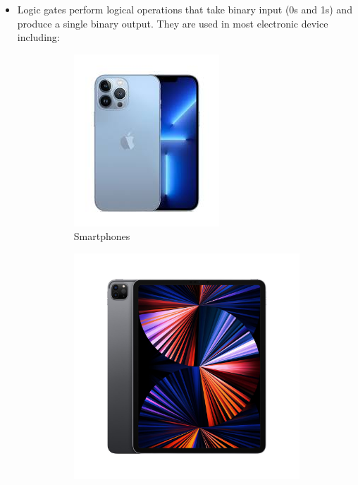 \documentclass{article}
\begin{document}
\begin{itemize}
		\item Logic gates perform logical operations that take binary input (0s and 1s) and produce  a single binary output. They are used in most electronic device including: \\
			\begin{figure}[h!]
				\centering
				\begin{subfigure}[b]{0.2\linewidth}
				\includegraphics[width=\linewidth]{phone}
				\caption{Smartphones}
				\end{subfigure}
			\begin{subfigure}[b]{0.2\linewidth}
				\includegraphics[width=\linewidth]{tablet}

\end{subfigure}
\end{figure}
\end{itemize}
\end{document}
